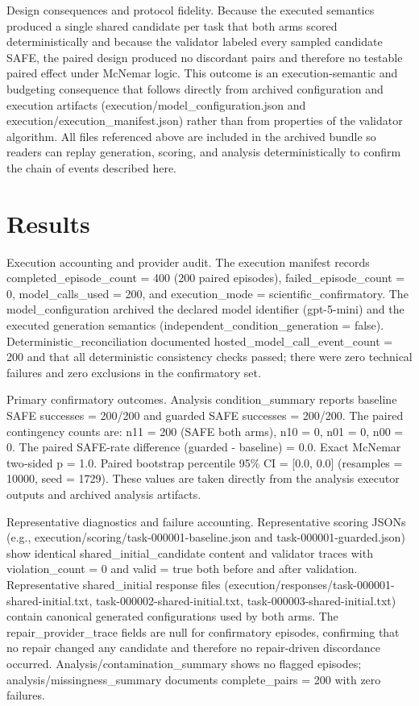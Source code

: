 \documentclass[conference]{IEEEtran}
\begin{document}
Design consequences and protocol fidelity. Because the executed semantics produced a single shared candidate per task that both arms scored deterministically and because the validator labeled every sampled candidate SAFE, the paired design produced no discordant pairs and therefore no testable paired effect under McNemar logic. This outcome is an execution‑semantic and budgeting consequence that follows directly from archived configuration and execution artifacts (execution/model\_configuration.json and execution/execution\_manifest.json) rather than from properties of the validator algorithm. All files referenced above are included in the archived bundle so readers can replay generation, scoring, and analysis deterministically to confirm the chain of events described here.

\section{Results}
Execution accounting and provider audit. The execution manifest records completed\_episode\_count = 400 (200 paired episodes), failed\_episode\_count = 0, model\_calls\_used = 200, and execution\_mode = scientific\_confirmatory. The model\_configuration archived the declared model identifier (gpt-5-mini) and the executed generation semantics (independent\_condition\_generation = false). Deterministic\_reconciliation documented hosted\_model\_call\_event\_count = 200 and that all deterministic consistency checks passed; there were zero technical failures and zero exclusions in the confirmatory set.

Primary confirmatory outcomes. Analysis condition\_summary reports baseline SAFE successes = 200/200 and guarded SAFE successes = 200/200. The paired contingency counts are: n11 = 200 (SAFE both arms), n10 = 0, n01 = 0, n00 = 0. The paired SAFE‑rate difference (guarded - baseline) = 0.0. Exact McNemar two‑sided p = 1.0. Paired bootstrap percentile 95\% CI = [0.0, 0.0] (resamples = 10000, seed = 1729). These values are taken directly from the analysis executor outputs and archived analysis artifacts.

Representative diagnostics and failure accounting. Representative scoring JSONs (e.g., execution/scoring/task-000001-baseline.json and task-000001-guarded.json) show identical shared\_initial\_candidate content and validator traces with violation\_count = 0 and valid = true both before and after validation. Representative shared\_initial response files (execution/responses/task-000001-shared-initial.txt, task-000002-shared-initial.txt, task-000003-shared-initial.txt) contain canonical generated configurations used by both arms. The repair\_provider\_trace fields are null for confirmatory episodes, confirming that no repair changed any candidate and therefore no repair‑driven discordance occurred. Analysis/contamination\_summary shows no flagged episodes; analysis/missingness\_summary documents complete\_pairs = 200 with zero failures.
\end{document}
